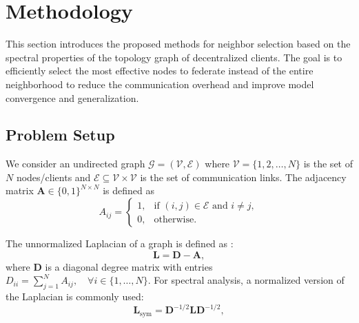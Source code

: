 \documentclass[journal]{IEEEtran}
\begin{document}
\section{Methodology}
\label{sec:methodology}

This section introduces the proposed methods for neighbor selection based on the spectral properties of the topology graph of decentralized clients. The goal is to efficiently select the most effective nodes to federate instead of the entire neighborhood to reduce the communication overhead and improve model convergence and generalization.

\vspace{-0.4 cm}
\subsection{Problem Setup} 
We consider an undirected  graph $\mathcal{G}=(\mathcal{V},\mathcal{E})$ where $\mathcal{V} = \{1,2,\dots,N\}$ is the set of $N$ nodes/clients and $\mathcal{E} \subseteq \mathcal{V} \times \mathcal{V}$ is the set of communication links. The adjacency matrix $\mathbf{A} \in \{0,1\}^{N \times N}$ is defined as
\begin{equation}
    A_{ij} =
        \begin{cases}
            1, & \text{if } (i,j) \in \mathcal{E} \text{ and } i \neq j, \\
            0, & \text{otherwise.}
        \end{cases}
\end{equation}

The unnormalized Laplacian of a graph is defined as \cite{graph_theory}:
\begin{equation}
    \mathbf{L} = \mathbf{D} - \mathbf{A},
\end{equation}
where $\mathbf{D}$ is a diagonal degree matrix with entries $D_{ii} = \sum_{j=1}^N A_{ij}, \quad \forall i \in \{1, \dots, N\}$. For spectral analysis, a normalized version of the Laplacian is commonly used:
\begin{equation}
    \mathbf{L}_{\text{sym}} = \mathbf{D}^{-1/2}\mathbf{L}\mathbf{D}^{-1/2},
\end{equation}
\end{document}
